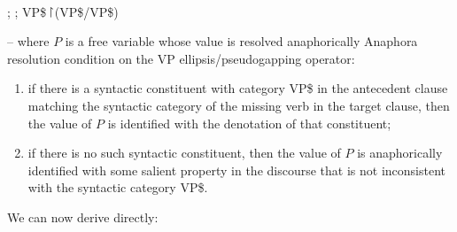 \documentclass[output=paper,colorlinks,citecolor=brown]{langscibook}
\begin{document}
\begin{exe}
 \ex\label{generalized}
   \\
  ; ; VP\$\ensuremath{\vs}(VP\$/VP\$)

   -- where $P$ is a free variable whose value is
  resolved anaphorically
 \ex\label{Acondition}
  Anaphora resolution condition on the VP ellipsis/pseudogapping
  operator:
  \begin{enumerate}
   \item
    if there is a syntactic  constituent
    with category VP\$ in the antecedent clause matching the
    syntactic  category of the missing verb in the target clause,
    then the value of $P$ is identified with the denotation of that constituent;
   \item
    if there is no such syntactic  constituent, then the value of $P$  is anaphorically
    identified with some salient property in the discourse that is not
    inconsistent with the syntactic  category VP\$.
  \end{enumerate}
\end{exe}
We can now derive  directly:
\end{document}

